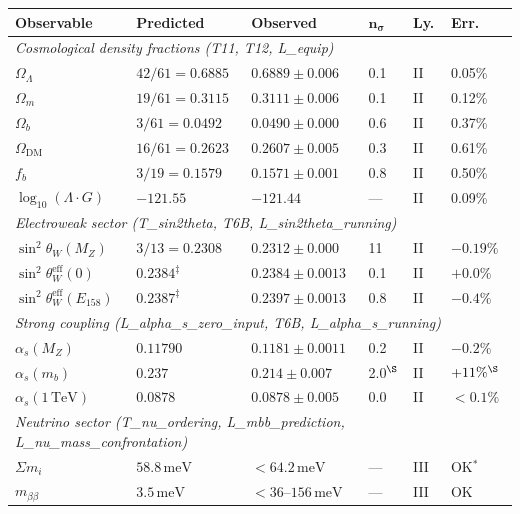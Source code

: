 \documentclass[11pt]{article}
\begin{document}
\smallskip
\begin{center}
\small
\begin{tabular}{p{2.5cm}p{2.9cm}p{2.5cm}p{0.6cm}p{0.5cm}p{1cm}}
\toprule
\textbf{Observable} & \textbf{Predicted} & \textbf{Observed} & $\boldsymbol{n_\sigma}$ & \textbf{Ly.} & \textbf{Err.} \\
\midrule
\multicolumn{6}{l}{\textit{Cosmological density fractions (T11, T12, L\_equip)}} \\
$\Omega_\Lambda$ & $42/61 = 0.6885$ & $0.6889 \pm 0.006$ & 0.1 & II & 0.05\% \\
$\Omega_m$ & $19/61 = 0.3115$ & $0.3111 \pm 0.006$ & 0.1 & II & 0.12\% \\
$\Omega_b$ & $3/61 = 0.0492$ & $0.0490 \pm 0.000$ & 0.6 & II & 0.37\% \\
$\Omega_{\mathrm{DM}}$ & $16/61 = 0.2623$ & $0.2607 \pm 0.005$ & 0.3 & II & 0.61\% \\
$f_b$ & $3/19 = 0.1579$ & $0.1571 \pm 0.001$ & 0.8 & II & 0.50\% \\
$\log_{10}(\Lambda\!\cdot\! G)$ & $-121.55$ & $-121.44$ & --- & II & 0.09\% \\
\midrule
\multicolumn{6}{l}{\textit{Electroweak sector (T\_sin2theta, T6B, L\_sin2theta\_running)}} \\
$\sin^2\!\theta_W(M_Z)$ & $3/13 = 0.2308$ & $0.2312 \pm 0.000$ & 11 & II & $-0.19\%$ \\
$\sin^2\!\theta_W^{\mathrm{eff}}(0)$ & $0.2384^\ddagger$ & $0.2384 \pm 0.0013$ & 0.1 & II & $+0.0\%$ \\
$\sin^2\!\theta_W^{\mathrm{eff}}(E_{158})$ & $0.2387^\ddagger$ & $0.2397 \pm 0.0013$ & 0.8 & II & $-0.4\%$ \\
\midrule
\multicolumn{6}{l}{\textit{Strong coupling (L\_alpha\_s\_zero\_input, T6B, L\_alpha\_s\_running)}} \\
$\alpha_s(M_Z)$ & $0.11790$ & $0.1181 \pm 0.0011$ & 0.2 & II & $-0.2\%$ \\
$\alpha_s(m_b)$ & $0.237$ & $0.214 \pm 0.007$ & 2.0$^\S$ & II & $+11\%^\S$ \\
$\alpha_s(1\,\mathrm{TeV})$ & $0.0878$ & $0.0878 \pm 0.005$ & 0.0 & II & $<0.1\%$ \\
\midrule
\multicolumn{6}{l}{\textit{Neutrino sector (T\_nu\_ordering, L\_mbb\_prediction, L\_nu\_mass\_confrontation)}} \\
$\Sigma m_i$ & $58.8\,\mathrm{meV}$ & ${<}64.2\,\mathrm{meV}$ & --- & III & OK$^{\ast}$ \\
$m_{\beta\beta}$ & $3.5\,\mathrm{meV}$ & ${<}36\text{--}156\,\mathrm{meV}$ & --- & III & OK \\

\end{tabular}
\end{center}
\end{document}
